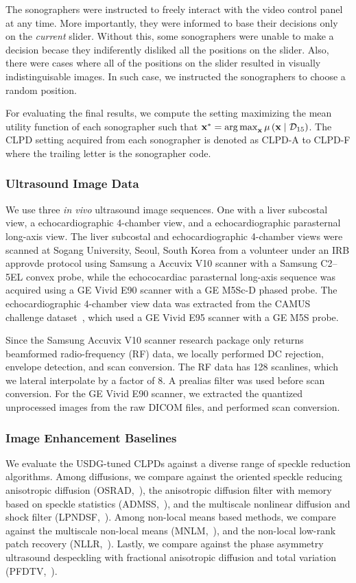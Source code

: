The sonographers were instructed to freely interact with the video control panel at any time.
More importantly, they were informed to base their decisions only on the \textit{current} slider.
Without this, some sonographers were unable to make a decision becase they indiferently disliked all the positions on the slider.
Also, there were cases where all of the positions on the slider resulted in visually indistinguisable images.
In such case, we instructed the sonographers to choose a random position.

For evaluating the final results, we compute the setting maximizing the mean utility function of each sonographer such that \( \mathbf{x}^* = \operatorname*{arg\,max}_{\mathbf{x}} \mu\left(\mathbf{x} \mid \mathcal{D}_{15} \right) \).
The CLPD setting acquired from each sonographer is denoted as CLPD-A to CLPD-F where the trailing letter is the sonographer code.

\subsubsection{Ultrasound Image Data}
We use three \textit{in vivo} ultrasound image sequences.
One with a liver subcostal view, a echocardiographic 4-chamber view, and a echocardiographic parasternal long-axis view.
The liver subcostal and echocardiographic 4-chamber views were scanned at Sogang University, Seoul, South Korea from a volunteer under an IRB approvde protocol using Samsung a Accuvix V10 scanner with a Samsung C2--5EL convex probe, while the echococardiac parasternal long-axis sequence was acquired using a GE Vivid E90 scanner with a GE M5Sc-D phased probe.
The echocardiographic 4-chamber view data was extracted from the CAMUS challenge dataset~\cite{leclerc_deep_2019}, which used a GE Vivid E95 scanner with a GE M5S probe.

Since the Samsung Accuvix V10 scanner research package only returns beamformed radio-frequency (RF) data, we locally performed DC rejection, envelope detection, and scan conversion.
The RF data has 128 scanlines, which we lateral interpolate by a factor of 8.
A prealias filter was used before scan conversion.
For the GE Vivid E90 scanner, we extracted the quantized unprocessed images from the raw DICOM files, and performed scan conversion.

\subsubsection{Image Enhancement Baselines}
We evaluate the USDG-tuned CLPDs against a diverse range of speckle reduction algorithms.
Among diffusions, we compare against the oriented speckle reducing anisotropic diffusion (OSRAD,~\cite{krissian_oriented_2007}), the anisotropic diffusion filter with memory based on speckle statistics (ADMSS,~\cite{ramos-llorden_anisotropic_2015}), and the multiscale nonlinear diffusion and shock filter (LPNDSF,~\cite{zhang_multiscale_2006}).
Among non-local means based methods, we compare against the multiscale non-local means (MNLM,~\cite{breivik_realtime_2017}), and the non-local low-rank patch recovery (NLLR,~\cite{zhu_nonlocal_2017}).
Lastly, we compare against the phase asymmetry ultrasound despeckling with fractional anisotropic diffusion and total variation (PFDTV,~\cite{mei_phase_2020}).

